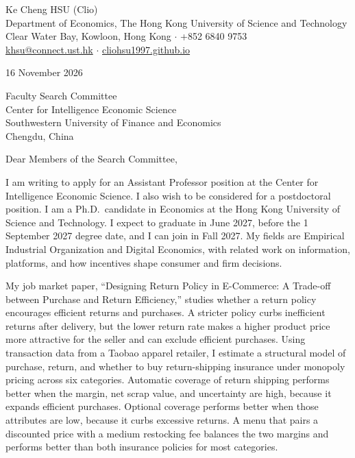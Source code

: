 \documentclass[11pt]{article}
\begin{document}
\begin{flushleft}
Ke Cheng HSU (Clio) \\
Department of Economics, The Hong Kong University of Science and Technology \\
Clear Water Bay, Kowloon, Hong Kong $\cdot$ +852 6840 9753 \\
\href{mailto:khsu@connect.ust.hk}{khsu@connect.ust.hk} $\cdot$ \href{https://cliohsu1997.github.io/}{cliohsu1997.github.io}
\end{flushleft}

16 November 2026

\vspace{0.12em}
Faculty Search Committee \\
Center for Intelligence Economic Science \\
Southwestern University of Finance and Economics \\
Chengdu, China

\vspace{0.12em}
Dear Members of the Search Committee,

I am writing to apply for an Assistant Professor position at the Center for Intelligence Economic Science. I also wish to be considered for a postdoctoral position. I am a Ph.D.\ candidate in Economics at the Hong Kong University of Science and Technology. I expect to graduate in June 2027, before the 1 September 2027 degree date, and I can join in Fall 2027. My fields are Empirical Industrial Organization and Digital Economics, with related work on information, platforms, and how incentives shape consumer and firm decisions.

My job market paper, ``Designing Return Policy in E-Commerce: A Trade-off between Purchase and Return Efficiency,'' studies whether a return policy encourages efficient returns and purchases. A stricter policy curbs inefficient returns after delivery, but the lower return rate makes a higher product price more attractive for the seller and can exclude efficient purchases. Using transaction data from a Taobao apparel retailer, I estimate a structural model of purchase, return, and whether to buy return-shipping insurance under monopoly pricing across six categories. Automatic coverage of return shipping performs better when the margin, net scrap value, and uncertainty are high, because it expands efficient purchases. Optional coverage performs better when those attributes are low, because it curbs excessive returns. A menu that pairs a discounted price with a medium restocking fee balances the two margins and performs better than both insurance policies for most categories.
\end{document}

